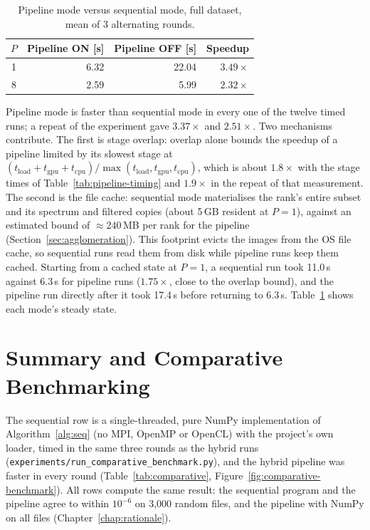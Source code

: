 \documentclass[a4paper,12pt]{report}
\begin{document}
\begin{table}[H]
\centering
\caption{Pipeline mode versus sequential mode, full dataset, mean of 3
alternating rounds.}
\label{tab:pipeline-onoff}
\begin{tabular}{@{}crrr@{}}
\toprule
$P$ & \textbf{Pipeline ON [s]} & \textbf{Pipeline OFF [s]} &
\textbf{Speedup} \\
\midrule
1 & 6.32 & 22.04 & $3.49\times$ \\
8 & 2.59 & 5.99 & $2.32\times$ \\
\bottomrule
\end{tabular}
\end{table}

Pipeline mode is faster than sequential mode in every one of the
twelve timed runs; a repeat of the experiment gave $3.37\times$ and $2.51\times$.
Two mechanisms contribute.
The first is stage overlap: overlap alone bounds the
speedup of a pipeline limited by its slowest stage at
$(t_{\mathrm{load}}+t_{\mathrm{gpu}}+t_{\mathrm{cpu}})
/\max(t_{\mathrm{load}},t_{\mathrm{gpu}},t_{\mathrm{cpu}})$, which is about
$1.8\times$ with the stage times of Table~\ref{tab:pipeline-timing} and $1.9\times$
in the repeat of that measurement.
The second is the file cache: sequential mode materialises the rank's
entire subset and its spectrum and filtered copies (about 5\,GB resident
at $P=1$), against an estimated bound of $\approx$240\,MB per rank for the pipeline
(Section~\ref{sec:agglomeration}). This footprint evicts the images
from the OS file cache, so sequential runs read them from disk while pipeline
runs keep them cached. Starting from a cached state at $P=1$, a sequential run took 11.0\,s against
6.3\,s for pipeline runs ($1.75\times$, close to the overlap bound), and
the pipeline run directly after it took 17.4\,s before returning to
6.3\,s. Table~\ref{tab:pipeline-onoff} shows each mode's steady state.

\section{Summary and Comparative Benchmarking}
\label{sec:comparative-benchmarking}

The sequential row is a single-threaded, pure NumPy implementation of
Algorithm~\ref{alg:seq} (no MPI, OpenMP or OpenCL) with the project's own loader,
timed in the same three rounds as the hybrid runs
(\texttt{experiments\slash{}run\_\discretionary{}{}{}comparative\_\discretionary{}{}{}benchmark.py}), and
the hybrid pipeline was faster in every round (Table~\ref{tab:comparative},
Figure~\ref{fig:comparative-benchmark}). All rows compute the same result: the
sequential program and the pipeline agree to within $10^{-6}$ on 3{,}000 random
files, and the pipeline with NumPy on all files (Chapter~\ref{chap:rationale}).
\end{document}
